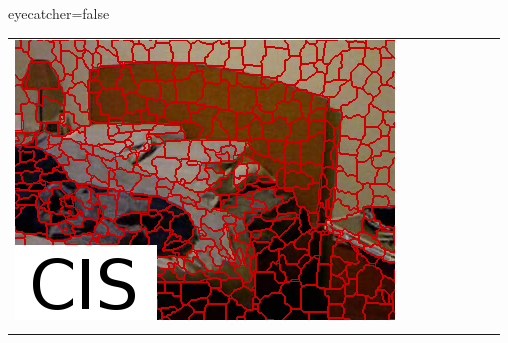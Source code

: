 \documentclass[portrait,final,a0paper,fontscale=0.28]{baposter}
\begin{document}
\begin{poster}{eyecatcher=false}
{\begin{tabularx}{\linewidth}{@{}Y@{}Y@{}Y@{}Y@{}Y@{}Y@{}Y@{}Y@{}}
{                \includegraphics{pictures/nyu-test-2-cis-excerpt}
            }
            &
            \\
            &
            \resizebox{\linewidth}{!}{
}
\end{tabularx}}
\end{poster}
\end{document}

